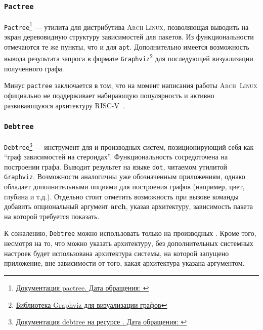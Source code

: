 \subsubsection{\texttt{Pactree}}
\texttt{Pactree}\footnote{\href{https://man.archlinux.org/man/extra/pacman-contrib/pactree.8.en}{Документация pactree. Дата обращения: }} --- утилита для дистрибутива \textsc{Arch Linux}, позволяющая выводить на экран деревовидную структуру зависимостей для пакетов.
Из функциональности отмечаются те же пункты, что и для \texttt{apt}. Дополнительно имеется возможность вывода результата запроса в формате \texttt{Graphviz}\footnote{\href{https://graphviz.org/}{Библиотека Graphviz для визуализации графов}} для последующей визуализации полученного графа.

Минус \texttt{pactree} заключается в том, что на момент написания работы \textsc{Arch~Linux} официально не поддерживает набирающую популярность и активно развивающуюся архитектуру \textsc{RISC-V}~\cite{RISCVSurvey}.

\subsubsection{\texttt{Debtree}}
\texttt{Debtree}\footnote{\href{https://manpages.ubuntu.com/manpages/xenial/man1/debtree.1.html}{Документация debtree на ресурсе {\ubuntu}. Дата обращения: }} --- инструмент для {\debian} и производных систем, позиционирующий себя как \enquote{граф зависимостей на стероидах}. Функциональность сосредоточена на построении графа.
Выводит результет на языке \texttt{dot}, читаемом утилитой \texttt{Graphviz}. Возможности аналогичны уже обозначенным приложениям, однако обладает дополнительными опциями для построения графов (например, цвет, глубина и т.д.).
Отдельно стоит отметить возможность при вызове команды добавить опциональный аргумент \textbf{arch}, указав архитектуру, зависимость пакета на которой требуется показать.

К сожалению, \texttt{Debtree} можно использовать только на производных {\debian}.
Кроме того, несмотря на то, что можно указать архитектуру, без дополнительных системных настроек будет использована архитектура системы, на которой запущено приложение, вне зависимости от того, какая архитектура указана аргументом.

